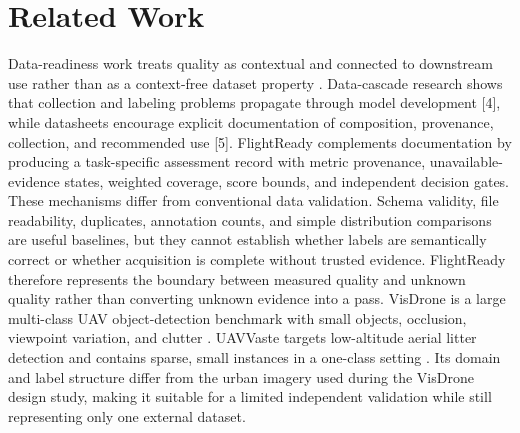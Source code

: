 \documentclass[conference]{IEEEtran}
\begin{document}
\section{Related Work}
Data-readiness work treats quality as contextual and connected to downstream use rather than as a context-free dataset property \cite{r1,r2,r3}. Data-cascade research shows that collection and labeling problems propagate through model development [4], while datasheets encourage explicit documentation of composition, provenance, collection, and recommended use [5]. FlightReady complements documentation by producing a task-specific assessment record with metric provenance, unavailable-evidence states, weighted coverage, score bounds, and independent decision gates.
These mechanisms differ from conventional data validation. Schema validity, file readability, duplicates, annotation counts, and simple distribution comparisons are useful baselines, but they cannot establish whether labels are semantically correct or whether acquisition is complete without trusted evidence. FlightReady therefore represents the boundary between measured quality and unknown quality rather than converting unknown evidence into a pass.
VisDrone is a large multi-class UAV object-detection benchmark with small objects, occlusion, viewpoint variation, and clutter \cite{r6}. UAVVaste targets low-altitude aerial litter detection and contains sparse, small instances in a one-class setting \cite{r7,r8}. Its domain and label structure differ from the urban imagery used during the VisDrone design study, making it suitable for a limited independent validation while still representing only one external dataset.
\end{document}
